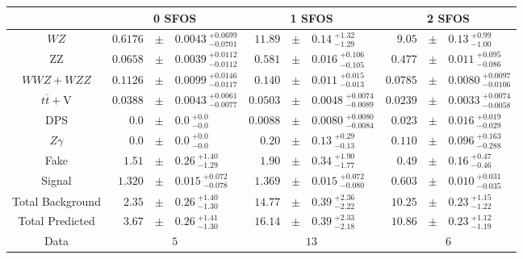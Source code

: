 \renewcommand{\tabcolsep}{2pt}
\small\begin{tabular}{c|rclrclrcl}
\hline
\hline
 & \multicolumn{3}{c}{0 SFOS} & \multicolumn{3}{c}{1 SFOS} & \multicolumn{3}{c}{2 SFOS}\\ 
\hline
$WZ$ &  $0.6176 $&$\pm$&$ 0.0043~^{+0.0699}_{-0.0701}$ &  $11.89 $&$\pm$&$ 0.14~^{+1.32}_{-1.29}$ &  $9.05 $&$\pm$&$ 0.13~^{+0.99}_{-1.00}$\\ 
ZZ &  $0.0658 $&$\pm$&$ 0.0039~^{+0.0112}_{-0.0112}$ &  $0.581 $&$\pm$&$ 0.016~^{+0.106}_{-0.105}$ &  $0.477 $&$\pm$&$ 0.011~^{+0.095}_{-0.086}$\\ 
$WWZ+WZZ$ &  $0.1126 $&$\pm$&$ 0.0099~^{+0.0146}_{-0.0117}$ &  $0.140 $&$\pm$&$ 0.011~^{+0.015}_{-0.013}$ &  $0.0785 $&$\pm$&$ 0.0080~^{+0.0097}_{-0.0106}$\\ 
$t\overline{t}+$V &  $0.0388 $&$\pm$&$ 0.0043~^{+0.0061}_{-0.0077}$ &  $0.0503 $&$\pm$&$ 0.0048~^{+0.0074}_{-0.0089}$ &  $0.0239 $&$\pm$&$ 0.0033~^{+0.0074}_{-0.0058}$\\ 
DPS &  $0.0 $&$\pm$&$ 0.0~^{+0.0}_{-0.0}$ &  $0.0088 $&$\pm$&$ 0.0080~^{+0.0080}_{-0.0084}$ &  $0.023 $&$\pm$&$ 0.016~^{+0.019}_{-0.029}$\\ 
$Z\gamma$ &  $0.0 $&$\pm$&$ 0.0~^{+0.0}_{-0.0}$ &  $0.20 $&$\pm$&$ 0.13~^{+0.29}_{-0.13}$ &  $0.110 $&$\pm$&$ 0.096~^{+0.163}_{-0.288}$\\ 
Fake &  $1.51 $&$\pm$&$ 0.26~^{+1.40}_{-1.29}$ &  $1.90 $&$\pm$&$ 0.34~^{+1.90}_{-1.77}$ &  $0.49 $&$\pm$&$ 0.16~^{+0.47}_{-0.46}$\\ 
Signal &  $1.320 $&$\pm$&$ 0.015~^{+0.072}_{-0.078}$ &  $1.369 $&$\pm$&$ 0.015~^{+0.072}_{-0.080}$ &  $0.603 $&$\pm$&$ 0.010~^{+0.031}_{-0.035}$\\ 
\hline
Total Background &  $2.35 $&$\pm$&$ 0.26~^{+1.40}_{-1.30}$ &  $14.77 $&$\pm$&$ 0.39~^{+2.36}_{-2.22}$ &  $10.25 $&$\pm$&$ 0.23~^{+1.15}_{-1.22}$\\ 
Total Predicted &  $3.67 $&$\pm$&$ 0.26~^{+1.41}_{-1.30}$ &  $16.14 $&$\pm$&$ 0.39~^{+2.33}_{-2.18}$ &  $10.86 $&$\pm$&$ 0.23~^{+1.12}_{-1.19}$\\ 
\hline
Data &  \multicolumn{3}{c}{$5$} &  \multicolumn{3}{c}{$13$} &  \multicolumn{3}{c}{$6$}\\ 
\hline
\end{tabular}
